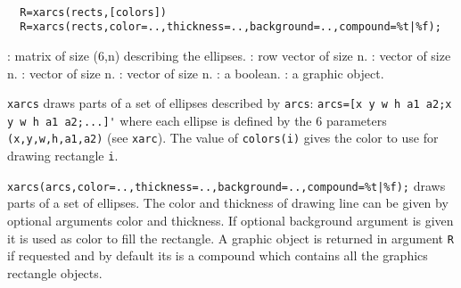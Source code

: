 
\begin{mandesc}
  \\ %
\end{mandesc}
\begin{calling_sequence}
\begin{verbatim}
  R=xarcs(rects,[colors])
  R=xarcs(rects,color=..,thickness=..,background=..,compound=%t|%f);
\end{verbatim}
\end{calling_sequence}

\begin{parameters}
  \begin{varlist}
    : matrix of size (6,n) describing the ellipses.
    : row vector of size n.
    : vector of size n.
    : vector of size n.
    : vector of size n.
    : a boolean.
    : a graphic object.
  \end{varlist}
\end{parameters}

\begin{mandescription}
  \verb!xarcs! draws parts of a set of ellipses described by \verb!arcs!:
  \verb!arcs=[x y w h a1 a2;x y w h a1 a2;...]'! where each ellipse is defined
  by the 6 parameters \verb!(x,y,w,h,a1,a2)! (see \verb!xarc!).
  The value of \verb!colors(i)! gives the color to use for drawing rectangle \verb!i!.

  \verb!xarcs(arcs,color=..,thickness=..,background=..,compound=%t|%f);!
  draws parts of a set of ellipses. The color and thickness of drawing line can be given by optional arguments
  color and thickness. If optional background argument is given it is used as color to fill
  the rectangle. A graphic object is returned in argument \verb!R! if requested and by default
  its is a compound which contains all the graphics rectangle objects.
\end{mandescription}

